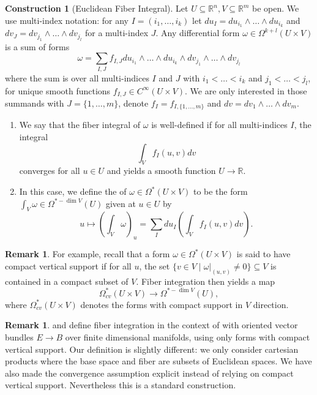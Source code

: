 \documentclass{scrartcl}
\let\emph\relax
\theoremstyle{plain}
\theoremstyle{definition}
\newtheorem{remark}[theorem]{Remark}
\newtheorem{construction}[theorem]{Construction}
\newcommand{\R}{\mathbb R}
\renewcommand{\subset}{\subseteq}
\begin{document}
\begin{construction} [Euclidean Fiber Integral]

    Let $U\subset \R^n, V\subset\R^m$ be open. We use multi-index notation: for any $I=(i_1, \dots, i_k)$ let $du_I = du_{i_1}\wedge\dots \wedge du_{i_k}$ and  $dv_J=dv_{j_1}\wedge\dots\wedge dv_{j_l}$ for a multi-index $J$. Any differential form $\omega\in\Omega^{k+l}(U\times V)$ is a sum of forms $$\omega = \sum_{I, J} f_{I, J} du_{i_1}\wedge\dots \wedge du_{i_k}\wedge dv_{j_1}\wedge\dots\wedge dv_{j_l}$$ where the sum is over all multi-indices $I$ and $J$ with $i_1<\dots<i_k$ and $j_1<\dots<j_l$, for unique smooth functions $f_{I,J}\in C^\infty(U\times V)$. We are only interested in those summands with $J=\{1, \dots, m\}$, denote $f_I = f_{I, \{1, \dots, m\}}$ and $dv = dv_1\wedge\dots\wedge dv_m$. 
    \begin{enumerate}
    \item We say that the fiber integral of $\omega$ is well-defined if for all  multi-indices $I$, the integral $$\int_V f_{I}(u, v) dv$$ converges for all $u\in U$ and yields a smooth function $U\to \R$. 
    
    \item In this case, we define the \emph{fiber integral} of $\omega\in \Omega^*(U\times V)$ to be the form $\int_V \omega\in\Omega^{*-\dim V}(U)$ given at $u\in U$ by
    $$u\mapsto \left(\int_V \omega\right)_u = \sum_I du_I \left(\int_V f_{I}(u, v) dv\right).$$
    \end{enumerate}
\end{construction}
\begin{remark}
For example, recall that a form $\omega\in \Omega^*(U\times V)$ is said to have  compact vertical support if for all $u$, the set $\{v\in V\mid \omega|_{(u, v)}\neq 0\}\subset V$ is contained in a compact subset of $V$. Fiber integration then yields a map $$\Omega^*_{cv}(U\times V)\to \Omega^{*-\dim V}(U),$$ where $\Omega^*_{cv}(U\times V)$ denotes the forms with compact support in $V$ direction. 
\end{remark}
\begin{remark}
    \cite{bott1982differential} and \cite{greub1972connections} define fiber integration in the context of with oriented vector bundles $E\to B$ over finite dimensional manifolds, using only forms with compact vertical support. Our definition is slightly different: we only consider cartesian products where the base space and fiber are subsets of Euclidean spaces. We have also made the convergence assumption explicit instead of relying on compact vertical support. Nevertheless this is a standard construction. 
\end{remark}
\end{document}
